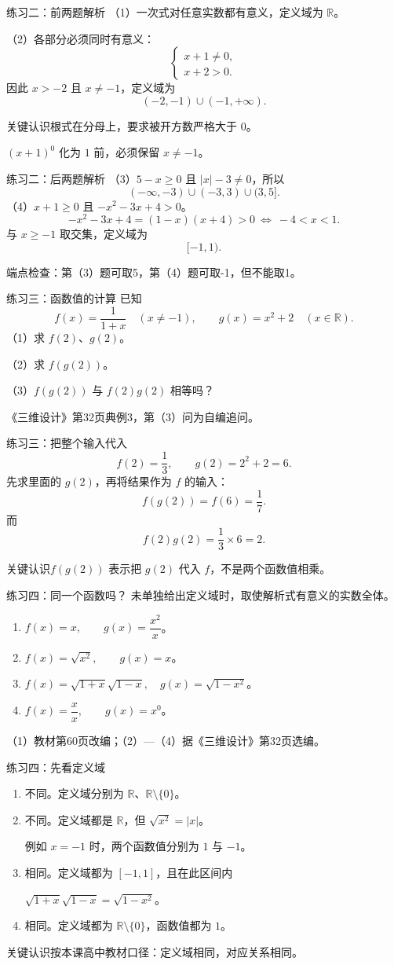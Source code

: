 \documentclass[aspectratio=169,10pt]{beamer}
\newcommand{\R}{\mathbb R}
\newcommand{\src}[1]{\par\vfill{\tiny\color{gray}#1}}
\newcommand{\key}[1]{\begin{block}{关键认识}#1\end{block}}
\begin{document}
\begin{frame}[t]{练习二：前两题解析}
（1）一次式对任意实数都有意义，定义域为 $\R$。\par\bigskip
（2）各部分必须同时有意义：
\[\begin{cases}x+1\ne0,\\x+2>0.\end{cases}\]
因此 $x>-2$ 且 $x\ne-1$，定义域为
\[\boxed{(-2,-1)\cup(-1,+\infty).}\]
\key{根式在分母上，要求被开方数严格大于 $0$。\par
$(x+1)^0$ 化为 $1$ 前，必须保留 $x\ne-1$。}
\end{frame}
\begin{frame}[t]{练习二：后两题解析}
（3）$5-x\ge0$ 且 $|x|-3\ne0$，所以
\[\boxed{(-\infty,-3)\cup(-3,3)\cup(3,5].}\]
（4）$x+1\ge0$ 且 $-x^2-3x+4>0$。
\[-x^2-3x+4=(1-x)(x+4)>0\ \Longleftrightarrow\ -4<x<1.\]
与 $x\ge-1$ 取交集，定义域为
\[\boxed{[-1,1).}\]
\src{端点检查：第（3）题可取5，第（4）题可取-1，但不能取1。}
\end{frame}
\begin{frame}[t]{练习三：函数值的计算}
已知
\[f(x)=\frac1{1+x}\quad(x\ne-1),\qquad g(x)=x^2+2\quad(x\in\R).\]
（1）求 $f(2)$、$g(2)$。\par
（2）求 $f(g(2))$。\par
（3）$f(g(2))$ 与 $f(2)g(2)$ 相等吗？
\src{《三维设计》第32页典例3，第（3）问为自编追问。}
\end{frame}
\begin{frame}[t]{练习三：把整个输入代入}
\[f(2)=\frac13,\qquad g(2)=2^2+2=6.\]
先求里面的 $g(2)$，再将结果作为 $f$ 的输入：
\[f(g(2))=f(6)=\boxed{\frac17}.\]
而
\[f(2)g(2)=\frac13\times6=2.\]
\key{$f(g(2))$ 表示把 $g(2)$ 代入 $f$，不是两个函数值相乘。}
\end{frame}
\begin{frame}[t]{练习四：同一个函数吗？}
未单独给出定义域时，取使解析式有意义的实数全体。
\begin{enumerate}
\item $f(x)=x,\qquad g(x)=\dfrac{x^2}{x}$。
\item $f(x)=\sqrt{x^2},\qquad g(x)=x$。
\item $f(x)=\sqrt{1+x}\sqrt{1-x},\quad g(x)=\sqrt{1-x^2}$。
\item $f(x)=\dfrac{x}{x},\qquad g(x)=x^0$。
\end{enumerate}
\src{（1）教材第60页改编；（2）—（4）据《三维设计》第32页选编。}
\end{frame}
\begin{frame}[t]{练习四：先看定义域}
\begin{enumerate}
\item 不同。定义域分别为 $\R$、$\R\setminus\{0\}$。
\item 不同。定义域都是 $\R$，但 $\sqrt{x^2}=|x|$。\par
例如 $x=-1$ 时，两个函数值分别为 $1$ 与 $-1$。
\item 相同。定义域都为 $[-1,1]$，且在此区间内\par
$\sqrt{1+x}\sqrt{1-x}=\sqrt{1-x^2}$。
\item 相同。定义域都为 $\R\setminus\{0\}$，函数值都为 $1$。
\end{enumerate}
\key{按本课高中教材口径：定义域相同，对应关系相同。}
\end{frame}
\end{document}

